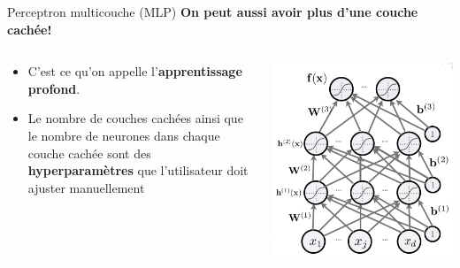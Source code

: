 \documentclass[french]{beamer}
\begin{document}
\begin{frame}{Perceptron multicouche (MLP)}
\textbf{On peut aussi avoir plus d'une couche cachée!}
\begin{columns}[T]
\begin{column}{.48\textwidth}
\begin{itemize}
	\item C'est ce qu'on appelle l'\textbf{apprentissage profond}.
	\item Le nombre de couches cachées ainsi que le nombre de neurones dans chaque couche cachée sont des \textbf{hyperparamètres} que l'utilisateur doit ajuster manuellement
\end{itemize}
\end{column}
\begin{column}{.48\textwidth}
\includegraphics[width=\textwidth]{figures/deep_nn}
\end{column}
\end{columns}
\end{frame}
\end{document}
